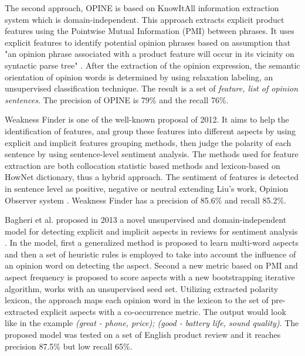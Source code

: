 The second approach, OPINE \cite{popescu2007extracting} is based on KnowItAll information extraction system which is domain-independent. This approach  extracts explicit product features using the Pointwise Mutual Information (PMI) between phrases. It uses explicit features to identify potential opinion phrases based on assumption that "an opinion phrase associated with a product feature will occur in its vicinity on syntactic parse tree" \cite{popescu2007extracting}. After the extraction of the opinion expression, the semantic orientation of opinion words is determined by using relaxation labeling, an unsupervised classification technique. The result is a set of \textit{feature, list of opinion sentences}. The precision of OPINE is 79\% and the recall 76\%.  

Weakness Finder \cite{zhang2012weakness} is one of the well-known proposal of 2012. It aims to help the identification of features, and group these features into different aspects by using explicit and implicit features grouping methods, then judge the polarity of each sentence by using sentence-level sentiment analysis. The methods used for feature extraction are both collocation statistic based methods and lexicon-based on HowNet dictionary, thus a hybrid approach. The sentiment of features is detected in sentence level as positive, negative or neutral extending Liu's work, Opinion Observer system \cite{liu2005opinion}. Weakness Finder has a precision of 85.6\% and recall 85.2\%. 

Bagheri et al. proposed in 2013  a novel unsupervised and domain-independent model for detecting explicit
and implicit aspects in reviews for sentiment analysis \cite{bagheri2013care}. In the model, first a generalized method is proposed to learn multi-word aspects and then a set of heuristic rules is employed to take into account the influence of an opinion word on detecting the aspect. Second a new metric based on PMI and aspect frequency is proposed to score aspects with a new bootstrapping iterative algorithm, works with an unsupervised seed set. Utilizing extracted polarity lexicon, the approach maps each opinion word in the lexicon to the set of pre-extracted explicit aspects with a co-occurrence metric. The output would look like in the example \textit{(great - phone, price); (good - battery life, sound quality)}. The proposed model was tested on a set of English product review and it reaches precision 87.5\% but low recall 65\%.


